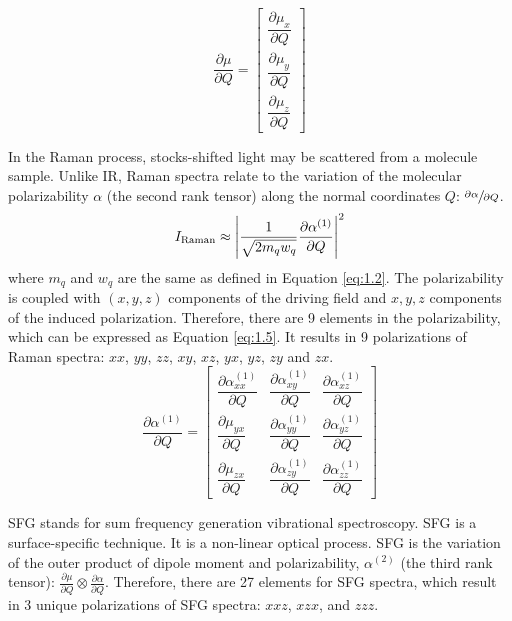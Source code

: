 \begin{equation} \label{eq:1.3}
\frac{\partial\mu}{\partial Q} = \begin{bmatrix}
									\dfrac{\partial\mu_{x}}{\partial Q} \\
									\dfrac{\partial\mu_{y}}{\partial Q} \\
									\dfrac{\partial\mu_{z}}{\partial Q}
								  \end{bmatrix}
\end{equation}

In the Raman process, stocks-shifted light may be scattered from a molecule sample. Unlike IR, Raman spectra relate to the variation of the molecular polarizability $\alpha$ (the second rank tensor) along the normal coordinates $Q$: $\sfrac{\partial\alpha}{\partial Q}$. \\ 

\begin{equation} \label{eq:1.4}
I_{\rm Raman} \approx \left| \frac{1}{\sqrt{2m_{q}w_{q}}} \frac{\partial\alpha^{(1)}}{\partial Q} \right|^{2}
\end{equation}
where $m_{q}$ and $w_{q}$ are the same as defined in Equation \ref{eq:1.2}. The polarizability is coupled with $(x, y, z)$ components of the driving field and $x, y, z$ components of the induced polarization. Therefore, there are 9 elements in the polarizability, which can be expressed as Equation \ref{eq:1.5}. It results in 9 polarizations of Raman spectra: $xx$, $yy$, $zz$, $xy$, $xz$, $yx$, $yz$, $zy$ and $zx$. \\

\begin{equation} \label{eq:1.5}
\frac{\partial\alpha^{(1)}}{\partial Q} = \begin{bmatrix}
\dfrac{\partial\alpha_{xx}^{(1)}}{\partial Q} & \dfrac{\partial\alpha_{xy}^{(1)}}{\partial Q} & \dfrac{\partial\alpha_{xz}^{(1)}}{\partial Q} \\
\dfrac{\partial\mu_{yx}}{\partial Q} & \dfrac{\partial\alpha_{yy}^{(1)}}{\partial Q} & \dfrac{\partial\alpha_{yz}^{(1)}}{\partial Q}\\
\dfrac{\partial\mu_{zx}}{\partial Q} & \dfrac{\partial\alpha_{zy}^{(1)}}{\partial Q} & \dfrac{\partial\alpha_{zz}^{(1)}}{\partial Q}
\end{bmatrix}
\end{equation}

SFG stands for sum frequency generation vibrational spectroscopy. SFG is a surface-specific technique. It is a non-linear optical process. SFG is the variation of the outer product of dipole moment and polarizability, $\alpha^{(2)}$ (the third rank tensor): $\frac{\partial\mu}{\partial Q} \otimes \frac{\partial\alpha}{\partial Q} $. Therefore, there are 27 elements for SFG spectra, which result in 3 unique polarizations of SFG spectra: $xxz$, $xzx$, and $zzz$. \\

